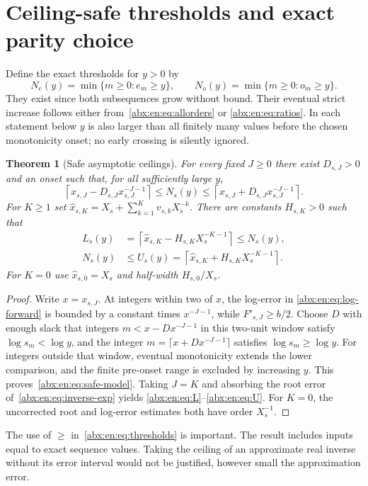 \documentclass[11pt,letterpaper]{article}
\numberwithin{equation}{section}
\newtheorem{theorem}{Theorem}[section]
\theoremstyle{remark}\newtheorem{remark}[theorem]{Remark}
\newcommand{\Ceil}[1]{\left\lceil #1\right\rceil}
\begin{document}
\section{Ceiling-safe thresholds and exact parity choice}\label{abx:en:sec:ceilings}
Define the exact thresholds for $y>0$ by
\begin{equation}\label{abx:en:eq:thresholds}
 N_e(y)=\min\{m\ge0:e_m\ge y\},\qquad
 N_o(y)=\min\{m\ge0:o_m\ge y\}.
\end{equation}
They exist since both subsequences grow without bound. Their eventual
strict increase follows either from~\eqref{abx:en:eq:allorders} or
\eqref{abx:en:eq:ratios}. In each statement below $y$ is also larger than
all finitely many values before the chosen monotonicity onset; no early
crossing is silently ignored.

\begin{theorem}[Safe asymptotic ceilings]\label{abx:en:thm:ceil}
For every fixed $J\ge0$ there exist $D_{s,J}>0$ and an onset such
that, for all sufficiently large $y$,
\begin{equation}\label{abx:en:eq:safe-model}
 \Ceil{x_{s,J}-D_{s,J}x_{s,J}^{-J-1}}
 \le N_s(y)\le
 \Ceil{x_{s,J}+D_{s,J}x_{s,J}^{-J-1}}.
\end{equation}
For $K\ge1$ set
$\widehat x_{s,K}=X_s+\sum_{k=1}^{K}v_{s,k}X_s^{-k}$.
There are constants $H_{s,K}>0$ such that
\begin{align}
 L_s(y)&=\Ceil{\widehat x_{s,K}-H_{s,K}X_s^{-K-1}}
       \le N_s(y),\label{abx:en:eq:L}\\
 N_s(y)&\le
 U_s(y)=\Ceil{\widehat x_{s,K}+H_{s,K}X_s^{-K-1}}.
 \label{abx:en:eq:U}
\end{align}
For $K=0$ use $\widehat x_{s,0}=X_s$ and half-width $H_{s,0}/X_s$.
\end{theorem}
\begin{proof}
Write $x=x_{s,J}$. At integers within two of $x$, the log-error in
\eqref{abx:en:eq:log-forward} is bounded by a constant times $x^{-J-1}$,
while $F'_{s,J}\ge b/2$. Choose $D$ with enough slack that
integers $m<x-Dx^{-J-1}$ in this two-unit window satisfy
$\log s_m<\log y$, and the integer
$m=\lceil x+Dx^{-J-1}\rceil$ satisfies $\log s_m\ge\log y$.
For integers outside that window, eventual monotonicity extends
the lower comparison, and the finite pre-onset range is excluded by
increasing $y$. This proves~\eqref{abx:en:eq:safe-model}. Taking $J=K$
and absorbing the root error of~\eqref{abx:en:eq:inverse-exp} yields
\eqref{abx:en:eq:L}--\eqref{abx:en:eq:U}. For $K=0$, the uncorrected root and
log-error estimates both have order $X_s^{-1}$.
\end{proof}
The use of $\ge$ in~\eqref{abx:en:eq:thresholds} is important. The result
includes inputs equal to exact sequence values. Taking the ceiling of
an approximate real inverse without its error interval would not be
justified, however small the approximation error.
\end{document}

